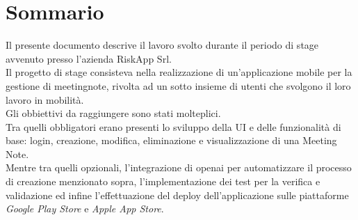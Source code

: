 \cleardoublepage
{}
{}
\begingroup
\let\clearpage\relax
\let\cleardoublepage\relax
\let\cleardoublepage\relax

\chapter*{Sommario}

Il presente documento descrive il lavoro svolto durante il periodo di stage avvenuto presso l'azienda RiskApp Srl. \\

\noindent Il progetto di stage consisteva nella realizzazione di un'applicazione mobile per la gestione di \gls{meetingnote}, rivolta ad un sotto insieme di utenti che svolgono il loro lavoro in mobilità. \\


\noindent Gli obbiettivi da raggiungere sono stati molteplici.\\
\indent Tra quelli obbligatori erano presenti lo sviluppo della UI e delle funzionalità di base: login, creazione, modifica, eliminazione e visualizzazione di una Meeting Note.\\
\indent Mentre tra quelli opzionali, l'integrazione di \gls{openai} per automatizzare il processo di creazione menzionato sopra, l'implementazione dei test per la verifica e validazione ed infine l'effettuazione del deploy dell'applicazione sulle piattaforme \emph{Google Play Store} e \emph{Apple App Store}.\\




\endgroup

\vfill
